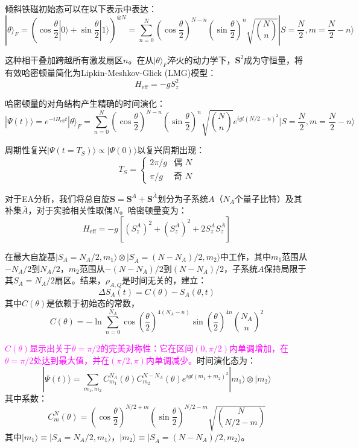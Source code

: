 \documentclass[11pt,a4paper]{article}
\begin{document}
倾斜铁磁初始态可以在以下表示中表达：
\[
|\theta\rangle_F = \left(\cos\frac{\theta}{2}|0\rangle + \sin\frac{\theta}{2}|1\rangle\right)^{\otimes N}
= \sum_{n=0}^{N} \left(\cos\frac{\theta}{2}\right)^{N-n} \left(\sin\frac{\theta}{2}\right)^n \sqrt{\binom{N}{n}} |S=\frac{N}{2}, m=\frac{N}{2}-n\rangle
\]

这种相干叠加跨越所有激发扇区$n$。在从$|\theta\rangle_F$淬火的动力学下，$\bm{S}^2$成为守恒量，将有效哈密顿量简化为Lipkin-Meshkov-Glick (LMG)模型：
\[
H_{\text{eff}} = -gS_z^2
\]

哈密顿量的对角结构产生精确的时间演化：
\[
|\Psi(t)\rangle = e^{-iH_{\text{eff}}t}|\theta\rangle_F = \sum_{n=0}^{N} \left(\cos\frac{\theta}{2}\right)^{N-n} \left(\sin\frac{\theta}{2}\right)^n \sqrt{\binom{N}{n}} e^{igt(N/2-n)^2} |S=\frac{N}{2}, m=\frac{N}{2}-n\rangle
\]

周期性复兴$|\Psi(t=T_S)\rangle \propto |\Psi(0)\rangle$以复兴周期出现：
\[
T_S = \begin{cases}
2\pi/g & \text{偶 } N \\
\pi/g & \text{奇 } N
\end{cases}
\]

对于EA分析，我们将总自旋$\bm{S} = \bm{S}^A + \bm{S}^{\overline{A}}$划分为子系统$A$（$N_A$个量子比特）及其补集$\overline{A}$，对于实验相关性取偶$N$。哈密顿量变为：
\[
H_{\text{eff}} = -g\left[(S_z^A)^2 + (S_z^{\overline{A}})^2 + 2S_z^A S_z^{\overline{A}}\right]
\]

在最大自旋基$|S_A=N_A/2,m_1\rangle \otimes |S_{\overline{A}}=(N-N_A)/2,m_2\rangle$中工作，其中$m_1$范围从$-N_A/2$到$N_A/2$，$m_2$范围从$-(N-N_A)/2$到$(N-N_A)/2$，子系统$A$保持局限于其$S_A=N_A/2$扇区。结果，$\rho_{A,Q}$是时间无关的，建立：
\[
\Delta S_A(t) = C(\theta) - S_A(\theta,t)
\]
其中$C(\theta)$是依赖于初始态的常数，
\[
C(\theta) = -\ln\sum_{n=0}^{N_A} \cos\left(\frac{\theta}{2}\right)^{4(N_A-n)} \sin\left(\frac{\theta}{2}\right)^{4n} \binom{N_A}{n}^2
\]

\textcolor{magenta}{$C(\theta)$显示出关于$\theta=\pi/2$的完美对称性：它在区间$(0,\pi/2)$内单调增加，在$\theta=\pi/2$处达到最大值，并在$(\pi/2,\pi)$内单调减少。}时间演化态为：
\[
|\Psi(t)\rangle = \sum_{m_1,m_2} C^{N_A}_{m_1}(\theta) C^{N-N_A}_{m_2}(\theta) e^{igt(m_1+m_2)^2} |m_1\rangle \otimes |m_2\rangle
\]
其中系数：
\[
C^{N}_{m}(\theta) = \left(\cos\frac{\theta}{2}\right)^{N/2+m} \left(\sin\frac{\theta}{2}\right)^{N/2-m} \sqrt{\binom{N}{N/2-m}}
\]
其中$|m_1\rangle \equiv |S_A=N_A/2,m_1\rangle$，$|m_2\rangle \equiv |S_{\overline{A}}=(N-N_A)/2,m_2\rangle$。
\end{document}
